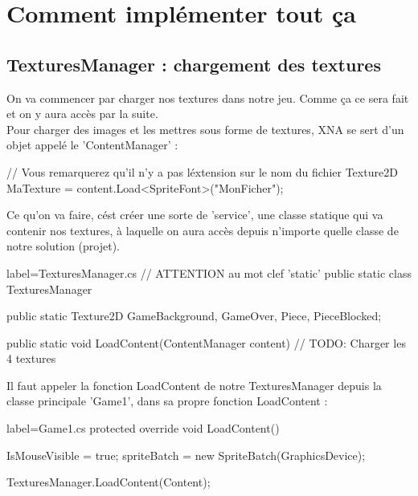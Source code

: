 \documentclass[a4paper]{article}
\begin{document}
\section{Comment implémenter tout ça}

\subsection{TexturesManager : chargement des textures}

On va commencer par charger nos textures dans notre jeu. Comme ça ce sera fait
et on y aura accès par la suite. \\

Pour charger des images et les mettres sous forme de textures, XNA se sert d'un
objet appelé le 'ContentManager' : \\

\begin{csharpcode}
// Vous remarquerez qu'il n'y a pas léxtension sur le nom du fichier
Texture2D MaTexture = content.Load<SpriteFont>("MonFicher");
\end{csharpcode}

\vspace{0.2cm}

Ce qu'on va faire, cést créer une sorte de 'service', une classe statique qui
va contenir nos textures, à laquelle on aura accès depuis n'importe quelle
classe de notre solution (projet). \\

\begin{csharpcode*}{label=TexturesManager.cs}
// ATTENTION au mot clef 'static'
public static class TexturesManager
{
    public static Texture2D GameBackground,
                            GameOver,
                            Piece,
                            PieceBlocked;

    public static void LoadContent(ContentManager content)
    {
        // TODO: Charger les 4 textures
    }
}
\end{csharpcode*}

\vspace{0.2cm}

Il faut appeler la fonction LoadContent de notre TexturesManager depuis la
classe principale 'Game1', dans sa propre fonction LoadContent : \\

\begin{csharpcode*}{label=Game1.cs}
protected override void LoadContent()
{
    IsMouseVisible = true;
    spriteBatch = new SpriteBatch(GraphicsDevice);

    TexturesManager.LoadContent(Content);
}
\end{csharpcode*}
\end{document}
